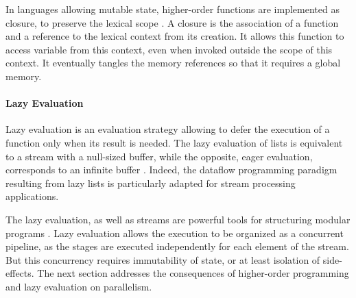 In languages allowing mutable state, higher-order functions are implemented as closure, to preserve the lexical scope \cite{Sussman1998}.
A closure is the association of a function and a reference to the lexical context from its creation.
It allows this function to access variable from this context, even when invoked outside the scope of this context.
It eventually tangles the memory references so that it requires a global memory.

\paragraph{Lazy Evaluation}

Lazy evaluation is an evaluation strategy allowing to defer the execution of a function only when its result is needed.
The lazy evaluation of lists is equivalent to a stream with a null-sized buffer, while the opposite, eager evaluation, corresponds to an infinite buffer \cite{VanRoy2003}.
Indeed, the dataflow programming paradigm resulting from lazy lists is particularly adapted for stream processing applications.

The lazy evaluation, as well as streams are powerful tools for structuring modular programs \cite{Sussman1983}.
Lazy evaluation allows the execution to be organized as a concurrent pipeline, as the stages are executed independently for each element of the stream.
But this concurrency requires immutability of state, or at least isolation of side-effects.
The next section addresses the consequences of higher-order programming and lazy evaluation on parallelism.



